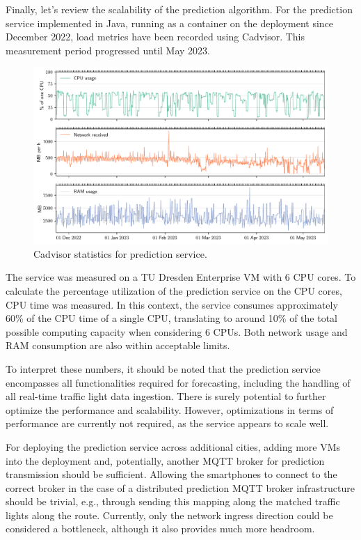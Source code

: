 Finally, let's review the scalability of the prediction algorithm. For the prediction service implemented in Java, running as a container on the deployment since December 2022, load metrics have been recorded using Cadvisor. This measurement period progressed until May 2023.

\begin{figure}[htbp]
    \centering
    \includegraphics[width=\linewidth]{images/monitoring-prediction-service-load.pdf}
    \caption{Cadvisor statistics for prediction service.}\label{fig:monitoring-prediction-service-load}
\end{figure}

The service was measured on a TU Dresden Enterprise VM with 6 CPU cores. To calculate the percentage utilization of the prediction service on the CPU cores, CPU time was measured. In this context, the service consumes approximately 60\% of the CPU time of a single CPU, translating to around 10\% of the total possible computing capacity when considering 6 CPUs. Both network usage and RAM consumption are also within acceptable limits.

To interpret these numbers, it should be noted that the prediction service encompasses all functionalities required for forecasting, including the handling of all real-time traffic light data ingestion. There is surely potential to further optimize the performance and scalability. However, optimizations in terms of performance are currently not required, as the service appears to scale well. 

For deploying the prediction service across additional cities, adding more VMs into the deployment and, potentially, another MQTT broker for prediction transmission should be sufficient. Allowing the smartphones to connect to the correct broker in the case of a distributed prediction MQTT broker infrastructure should be trivial, e.g., through sending this mapping along the matched traffic lights along the route. Currently, only the network ingress direction could be considered a bottleneck, although it also provides much more headroom.


